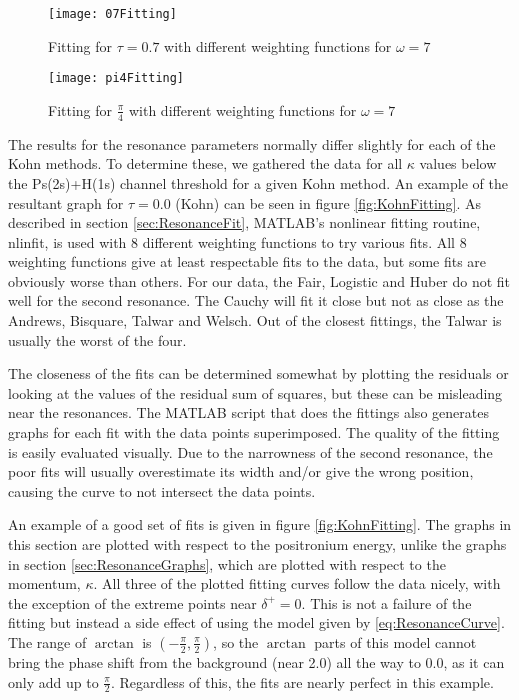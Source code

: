 \documentclass[Dissertation.tex]{subfiles}
\begin{document}
\begin{figure}[H]
	\centering
	\texttt{[image: 07Fitting]}
	\caption{Fitting for $\tau = 0.7$ with different weighting functions for $\omega = 7$}
	\label{fig:07Fitting}
\end{figure}

\begin{figure}[H]
	\centering
	\texttt{[image: pi4Fitting]}
	\caption{Fitting for $\frac{\pi}{4}$ with different weighting functions for $\omega = 7$}
	\label{fig:pi4Fitting}
\end{figure}

The results for the resonance parameters normally differ slightly for each of the Kohn methods.  To determine these, we gathered the data for all $\kappa$ values below the Ps(2s)+H(1s) channel threshold for a given Kohn method.  An example of the resultant graph for $\tau = 0.0$ (Kohn) can be seen in figure \ref{fig:KohnFitting}.  As described in section \ref{sec:ResonanceFit}, MATLAB's nonlinear fitting routine, nlinfit, is used with 8 different weighting functions to try various fits.  All 8 weighting functions give at least respectable fits to the data, but some fits are obviously worse than others.  For our data, the Fair, Logistic and Huber do not fit well for the second resonance.  The Cauchy will fit it close but not as close as the Andrews, Bisquare, Talwar and Welsch.  Out of the closest fittings, the Talwar is usually the worst of the four.

The closeness of the fits can be determined somewhat by plotting the residuals or looking at the values of the residual sum of squares, but these can be misleading near the resonances.  The MATLAB script that does the fittings also generates graphs for each fit with the data points superimposed.  The quality of the fitting is easily evaluated visually.  Due to the narrowness of the second resonance, the poor fits will usually overestimate its width and/or give the wrong position, causing the curve to not intersect the data points.

An example of a good set of fits is given in figure \ref{fig:KohnFitting}.  The graphs in this section are plotted with respect to the positronium energy, unlike the graphs in section \ref{sec:ResonanceGraphs}, which are plotted with respect to the momentum, $\kappa$.  All three of the plotted fitting curves follow the data nicely, with the exception of the extreme points near $\delta^+ = 0$.  This is not a failure of the fitting but instead a side effect of using the model given by \ref{eq:ResonanceCurve}.  The range of $\arctan$ is $(-\frac{\pi}{2},\frac{\pi}{2})$, so the $\arctan$ parts of this model cannot bring the phase shift from the background (near 2.0) all the way to 0.0, as it can only add up to $\frac{\pi}{2}$.  Regardless of this, the fits are nearly perfect in this example.
\end{document}
